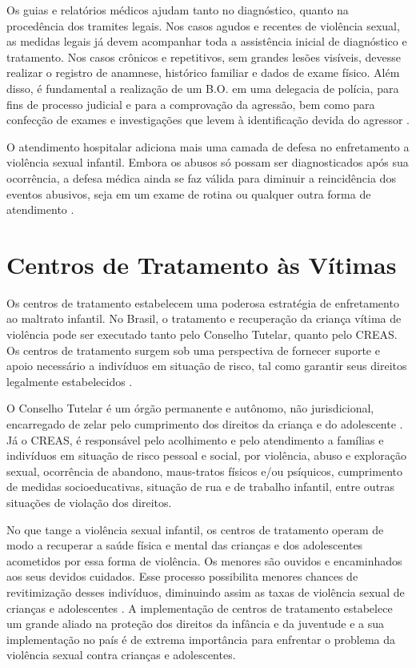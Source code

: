 Os guias e relatórios médicos ajudam tanto no diagnóstico, quanto na procedência dos tramites legais. Nos casos agudos e recentes de violência sexual, as medidas legais já devem acompanhar toda a assistência inicial de diagnóstico e tratamento. Nos casos crônicos e repetitivos, sem grandes lesões visíveis, devesse realizar o registro de anamnese, histórico familiar e dados de exame físico. Além disso, é fundamental a realização de um \ac{B.O.} em uma delegacia de polícia, para fins de processo judicial e para a comprovação da agressão, bem como para confecção de exames e investigações que levem à identificação devida do agressor \cite{paiva2012violencia}. 

O atendimento hospitalar adiciona mais uma camada de defesa no enfretamento a violência sexual infantil. Embora os abusos só possam ser diagnosticados após sua ocorrência, a defesa médica ainda se faz válida para diminuir a reincidência dos eventos abusivos, seja em um exame de rotina ou qualquer outra forma de atendimento \cite{costa2019maus}.


\section{Centros de Tratamento às Vítimas}\label{sec:centros}

Os centros de tratamento estabelecem uma poderosa estratégia de enfretamento ao maltrato infantil. No Brasil, o tratamento e recuperação da criança vítima de violência pode ser executado tanto pelo Conselho Tutelar, quanto pelo \ac{CREAS}. Os centros de tratamento surgem sob uma perspectiva de fornecer suporte e apoio necessário a indivíduos em situação de risco, tal como garantir seus direitos legalmente estabelecidos \cite{caccia2014conselheiros}.

O Conselho Tutelar é um órgão permanente e autônomo, não jurisdicional, encarregado de zelar pelo cumprimento dos direitos da criança e do adolescente \cite{brasil2002notificacao}. Já o \ac{CREAS}, é responsável pelo acolhimento e pelo atendimento a famílias e indivíduos em situação de risco pessoal e social, por violência, abuso e exploração sexual, ocorrência de abandono, maus-tratos físicos e/ou psíquicos, cumprimento de medidas socioeducativas, situação de rua e de trabalho infantil, entre outras situações de violação dos direitos.

No que tange a violência sexual infantil, os centros de tratamento operam de modo a recuperar a saúde física e mental das crianças e dos adolescentes acometidos por essa forma de violência. Os menores são ouvidos e encaminhados aos seus devidos cuidados. Esse processo possibilita menores chances de revitimização desses indivíduos, diminuindo assim as taxas de violência sexual de crianças e adolescentes \cite{faraj2016atendimento}. A implementação de centros de tratamento estabelece um grande aliado na proteção dos direitos da infância e da juventude e a sua implementação no país é de extrema importância para enfrentar o problema da violência sexual contra crianças e adolescentes. 

